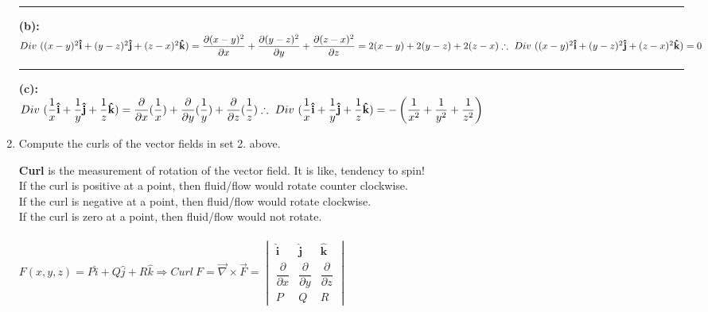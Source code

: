 \documentclass[fleqn]{article}
\begin{document}
\begin{enumerate}
      \rule{15cm}{1pt}

      \textcolor{hwColor}{
        \textbf{(b):} \\
        $
          Div ~ ((x-y)^2 \mathbf{\hat{i}}+(y-z)^2 \mathbf{\hat{j}}+(z-x)^2 \mathbf{\hat{k}}) \\ \\
          =\dfrac{\partial (x-y)^2}{\partial x}+\dfrac{\partial (y-z)^2}{\partial y}+\dfrac{\partial (z-x)^2}{\partial z}=2(x-y)+2(y-z)+2(z-x) \\
          \\
          \therefore ~ Div ~ ((x-y)^2 \mathbf{\hat{i}}+(y-z)^2 \mathbf{\hat{j}}+(z-x)^2 \mathbf{\hat{k}})=0 \\
        $
      }

      \rule{15cm}{1pt}

      \textcolor{hwColor}{
        \textbf{(c):} \\
        $
          Div ~ (\dfrac{1}{x} \mathbf{\hat{i}}+\dfrac{1}{y} \mathbf{\hat{j}}+\dfrac{1}{z} \mathbf{\hat{k}})=\dfrac{\partial}{\partial x}(\dfrac{1}{x})+\dfrac{\partial}{\partial y}(\dfrac{1}{y})+\dfrac{\partial}{\partial z}(\dfrac{1}{z}) \\ \\
          \therefore ~ Div ~ (\dfrac{1}{x} \mathbf{\hat{i}}+\dfrac{1}{y} \mathbf{\hat{j}}+\dfrac{1}{z} \mathbf{\hat{k}})=-\left(\dfrac{1}{x^2}+\dfrac{1}{y^2}+\dfrac{1}{z^2}\right)
        $
      }
    
    \item Compute the curls of the vector fields in set 2. above.
    
      \textcolor{hwColor}{
        \textbf{Curl} is the measurement of rotation of the vector field. It is like, tendency to spin! \\
        If the curl is positive at a point, then fluid/flow would rotate counter clockwise. \\
        If the curl is negative at a point, then fluid/flow would rotate clockwise. \\
        If the curl is zero at a point, then fluid/flow would not rotate. \\
        \\
        $
          F(x,y,z)=P \hat{i}+Q\hat{j}+R\hat{k} \Rightarrow Curl ~ F=\overrightarrow{\nabla} \times \overrightarrow{F}=\begin{vmatrix}
            \mathbf{\hat{i}} & \mathbf{\hat{j}} & \mathbf{\hat{k}} \\
            \dfrac{\partial}{\partial x} & \dfrac{\partial}{\partial y} & \dfrac{\partial}{\partial z} \\
            P & Q & R
          \end{vmatrix}
        $
      }
    

\end{enumerate}
\end{document}
